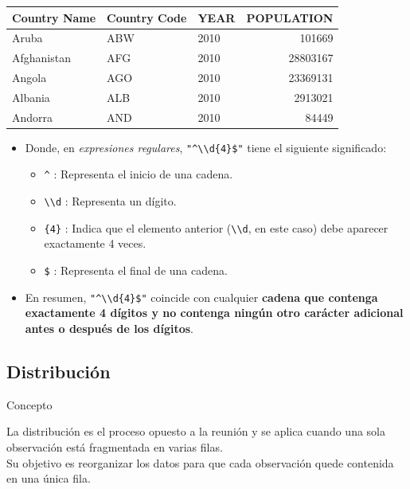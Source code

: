 \documentclass[
]{book}
\providecommand{\tightlist}{%
  \setlength{\itemsep}{0pt}\setlength{\parskip}{0pt}}
\begin{document}
\begin{tabular}{l|l|l|r}
\hline
Country Name & Country Code & YEAR & POPULATION\\
\hline
Aruba & ABW & 2010 & 101669\\
\hline
Afghanistan & AFG & 2010 & 28803167\\
\hline
Angola & AGO & 2010 & 23369131\\
\hline
Albania & ALB & 2010 & 2913021\\
\hline
Andorra & AND & 2010 & 84449\\
\hline
\end{tabular}

\begin{itemize}
\item
  Donde, en \emph{expresiones regulares}, \texttt{"\^{}\textbackslash{}\textbackslash{}d\{4\}\$"} tiene el siguiente significado:

  \begin{itemize}
  \tightlist
  \item
    \texttt{\^{}} : Representa el inicio de una cadena.\\
  \item
    \texttt{\textbackslash{}\textbackslash{}d} : Representa un dígito.\\
  \item
    \texttt{\{4\}} : Indica que el elemento anterior (\texttt{\textbackslash{}\textbackslash{}d}, en este caso) debe aparecer exactamente 4 veces.\\
  \item
    \texttt{\$} : Representa el final de una cadena.
  \end{itemize}
\item
  En resumen, \texttt{"\^{}\textbackslash{}\textbackslash{}d\{4\}\$"} coincide con cualquier \textbf{cadena que contenga exactamente 4 dígitos y no contenga ningún otro carácter adicional antes o después de los dígitos}.
\end{itemize}

\subsection{Distribución}\label{distribuciuxf3n}

{} Concepto

La distribución es el proceso opuesto a la reunión y
se aplica cuando una sola observación está fragmentada en varias filas.\\
Su objetivo es reorganizar los datos para que cada observación quede contenida en una única fila.
\end{document}
